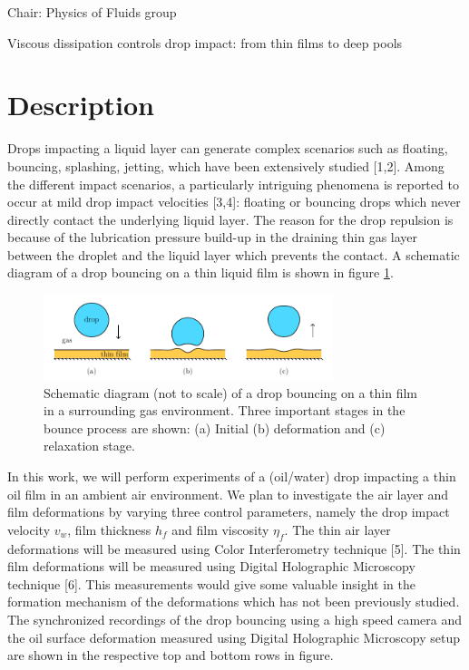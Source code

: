 \documentclass[a4paper,10pt]{article}
\begin{document}
\noindent Chair: Physics of Fluids group
\begin{center}
	\begin{LARGE}
		Viscous dissipation controls drop impact: from thin films to deep pools 
	\end{LARGE}
\end{center}

\section*{Description}
Drops impacting a liquid layer can generate complex scenarios such as floating, bouncing, splashing, jetting, which have been extensively studied [1,2]. Among the different impact scenarios, a particularly intriguing phenomena is reported to occur at mild drop impact velocities [3,4]: floating or bouncing drops which never directly contact the underlying liquid layer. The reason for the drop repulsion is because of the lubrication pressure build-up in the draining thin gas layer between the droplet and the liquid layer which prevents the contact. A schematic diagram of a drop bouncing on a thin liquid film is shown in figure \ref{fig:bouncing_schematic}.\\

\begin{figure}[H]
\centering
\includegraphics[width=0.75\textwidth]{drop_bounce_schematic.pdf}
\caption{Schematic diagram (not to scale) of a drop bouncing on a thin film in a surrounding gas environment. Three important stages in the bounce process are shown: (a) Initial (b) deformation and (c) relaxation stage.}
\label{fig:bouncing_schematic}
\end{figure}

In this work, we will perform experiments of a (oil/water) drop impacting a thin oil film in an ambient air environment. We plan to investigate the air layer and film deformations by varying three control parameters, namely the drop impact velocity $v_{w}$, film thickness $h_{f}$ and film viscosity $\eta_{f}$. The thin air layer deformations will be measured using Color Interferometry technique [5]. The thin film deformations will be measured using Digital Holographic Microscopy technique [6]. This measurements would give some valuable insight in the formation mechanism of the deformations which has not been previously studied. The synchronized recordings of the drop bouncing using a high speed camera and the oil surface deformation measured using Digital Holographic Microscopy setup are shown in the respective top and bottom rows in figure.\\
\end{document}
